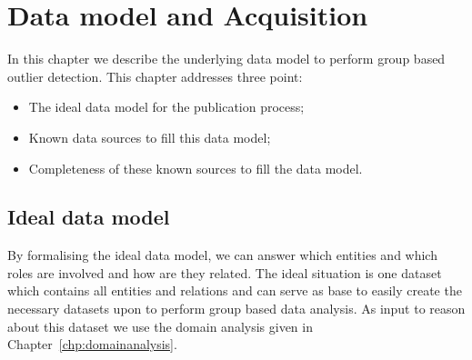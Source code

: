\documentclass{ou-report}
\begin{document}








\chapter{Data model and Acquisition}
\label{chp:data}
In this chapter we describe the underlying data model to perform group based 
outlier detection. This chapter addresses three point:
\begin{itemize}
    \item The ideal data model for the publication process;
    \item Known data sources to fill this data model;
    \item Completeness of these known sources to fill the data model.
\end{itemize}


\section{Ideal data model}
By formalising the ideal data model, we can answer which entities and which 
roles are involved and how are they related.
The ideal situation is one dataset which contains all entities and relations 
and can serve as base to easily create the necessary datasets upon to perform 
group based data analysis. As 
input to reason about this dataset we use the domain analysis given in 
Chapter~\ref{chp:domainanalysis}.
\end{document}
